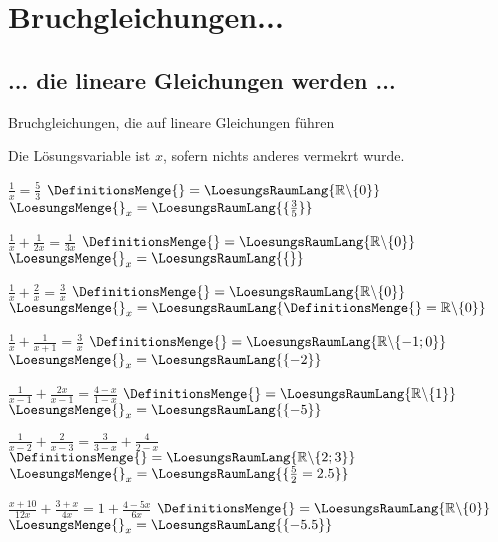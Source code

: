 \newpage
\section{Bruchgleichungen...}
\subsection{... die lineare Gleichungen werden ...}

Bruchgleichungen, die auf lineare Gleichungen führen

Die Lösungsvariable ist $x$, sofern nichts anderes vermekrt wurde.


\begin{bbwAufgabenBlock}
\item $\frac1x = \frac53$     \hspace{10mm}              $\DefinitionsMenge{}= \LoesungsRaumLang{\mathbb{R}\backslash\{0\}}$    $\LoesungsMenge{}_x = \LoesungsRaumLang{\{\frac35\}}$
\item $\frac1x + \frac1{2x} = \frac1{3x}$ \hspace{10mm}   $\DefinitionsMenge{}= \LoesungsRaumLang{\mathbb{R}\backslash\{0\}}$    $\LoesungsMenge{}_x = \LoesungsRaumLang{\{\}}$\noTRAINER{\newpage}
\item $\frac1x + \frac2x = \frac3x$  \hspace{10mm}       $\DefinitionsMenge{}= \LoesungsRaumLang{\mathbb{R}\backslash\{0\}}$    $\LoesungsMenge{}_x = \LoesungsRaumLang{\DefinitionsMenge{}=\mathbb{R}\backslash\{0\}}$
\item $\frac1x + \frac1{x+1} = \frac3x$ \hspace{10mm}    $\DefinitionsMenge{}= \LoesungsRaumLang{\mathbb{R}\backslash\{-1;0\}}$ $\LoesungsMenge{}_x = \LoesungsRaumLang{\{-2\}}$
\item $\frac1{x-1} + \frac{2x}{x-1} = \frac{4-x}{1-x}$ \hspace{10mm}    $\DefinitionsMenge{}= \LoesungsRaumLang{\mathbb{R}\backslash\{1\}}$ $\LoesungsMenge{}_x = \LoesungsRaumLang{\{-5\}}$\noTRAINER{\newpage}
\item $\frac1{x-2} + \frac{2}{x-3} = \frac3{3-x} + \frac{4}{2-x}$ \hspace{10mm}    $\DefinitionsMenge{}= \LoesungsRaumLang{\mathbb{R}\backslash\{2;3\}}$ $\LoesungsMenge{}_x = \LoesungsRaumLang{\{\frac{5}{2}=2.5\}}$
\item $\frac{x+10}{12x} + \frac{3+x}{4x} = 1 + \frac{4-5x}{6x}$ \hspace{10mm}    $\DefinitionsMenge{}= \LoesungsRaumLang{\mathbb{R}\backslash\{0\}}$ $\LoesungsMenge{}_x = \LoesungsRaumLang{\{-5.5\}}$
\end{bbwAufgabenBlock}

